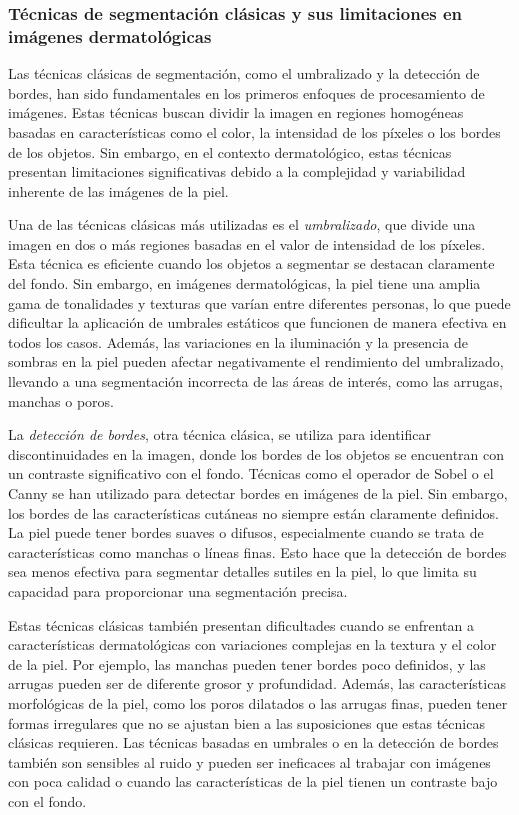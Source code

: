 \subsubsection{Técnicas de segmentación clásicas y sus limitaciones en imágenes dermatológicas}
Las técnicas clásicas de segmentación, como el umbralizado y la detección de bordes, han sido fundamentales en los primeros enfoques de procesamiento de imágenes. Estas técnicas buscan dividir la imagen en regiones homogéneas basadas en características como el color, la intensidad de los píxeles o los bordes de los objetos. Sin embargo, en el contexto dermatológico, estas técnicas presentan limitaciones significativas debido a la complejidad y variabilidad inherente de las imágenes de la piel.

Una de las técnicas clásicas más utilizadas es el \textit{umbralizado}, que divide una imagen en dos o más regiones basadas en el valor de intensidad de los píxeles. Esta técnica es eficiente cuando los objetos a segmentar se destacan claramente del fondo. Sin embargo, en imágenes dermatológicas, la piel tiene una amplia gama de tonalidades y texturas que varían entre diferentes personas, lo que puede dificultar la aplicación de umbrales estáticos que funcionen de manera efectiva en todos los casos. Además, las variaciones en la iluminación y la presencia de sombras en la piel pueden afectar negativamente el rendimiento del umbralizado, llevando a una segmentación incorrecta de las áreas de interés, como las arrugas, manchas o poros.

La \textit{detección de bordes}, otra técnica clásica, se utiliza para identificar discontinuidades en la imagen, donde los bordes de los objetos se encuentran con un contraste significativo con el fondo. Técnicas como el operador de Sobel o el Canny se han utilizado para detectar bordes en imágenes de la piel. Sin embargo, los bordes de las características cutáneas no siempre están claramente definidos. La piel puede tener bordes suaves o difusos, especialmente cuando se trata de características como manchas o líneas finas. Esto hace que la detección de bordes sea menos efectiva para segmentar detalles sutiles en la piel, lo que limita su capacidad para proporcionar una segmentación precisa.

Estas técnicas clásicas también presentan dificultades cuando se enfrentan a características dermatológicas con variaciones complejas en la textura y el color de la piel. Por ejemplo, las manchas pueden tener bordes poco definidos, y las arrugas pueden ser de diferente grosor y profundidad. Además, las características morfológicas de la piel, como los poros dilatados o las arrugas finas, pueden tener formas irregulares que no se ajustan bien a las suposiciones que estas técnicas clásicas requieren. Las técnicas basadas en umbrales o en la detección de bordes también son sensibles al ruido y pueden ser ineficaces al trabajar con imágenes con poca calidad o cuando las características de la piel tienen un contraste bajo con el fondo.

